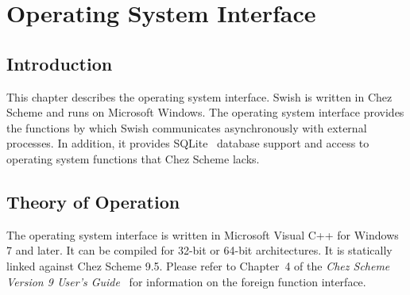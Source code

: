%
%
%

\chapter {Operating System Interface}\label{chap:osi}

\section {Introduction}

This chapter describes the operating system interface. Swish is
written in Chez Scheme and runs on Microsoft Windows.  The operating
system interface provides the functions by which Swish communicates
asynchronously with external processes. In addition, it
provides SQLite~\cite{sqlite-guide} database support and access to
operating system functions that Chez Scheme lacks.

\section {Theory of Operation}

The operating system interface is written in Microsoft Visual C++ for
Windows 7 and later. It can be compiled for 32-bit or 64-bit
architectures. It is statically linked against Chez Scheme 9.5.
Please refer to Chapter~4 of the \emph{Chez Scheme Version 9 User's
  Guide}~\cite{chez-scheme-users-guide} for information on the foreign
function interface.

